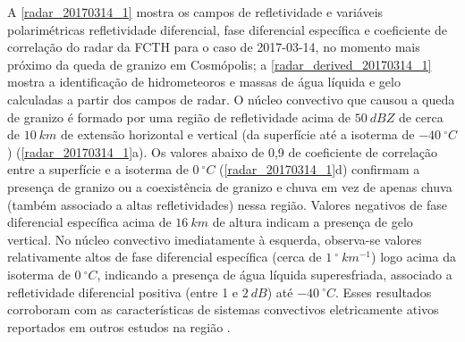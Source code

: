 A \autoref{radar_20170314_1} mostra os campos de refletividade e variáveis polarimétricas refletividade diferencial, fase diferencial específica e coeficiente de correlação do radar da FCTH para o caso de 2017-03-14, no momento mais próximo da queda de granizo em Cosmópolis; a \autoref{radar_derived_20170314_1} mostra a identificação de hidrometeoros e massas de água líquida e gelo calculadas a partir dos campos de radar. O núcleo convectivo que causou a queda de granizo é formado por uma região de refletividade acima de $50\:dBZ$ de cerca de $10\:km$ de extensão horizontal e vertical (da superfície até a isoterma de $-40\:^{\circ}C$) (\autoref{radar_20170314_1}a). Os valores abaixo de 0,9 de coeficiente de correlação entre a superfície e a isoterma de $0\:^{\circ}C$ (\autoref{radar_20170314_1}d) confirmam a presença de granizo ou a coexistência de granizo e chuva em vez de apenas chuva (também associado a altas refletividades) nessa região. Valores negativos de fase diferencial específica acima de $16\:km$ de altura indicam a presença de gelo vertical. No núcleo convectivo imediatamente à esquerda, observa-se valores relativamente altos de fase diferencial específica (cerca de $1\:^\circ\:km^{-1}$) logo acima da isoterma de $0\:^{\circ}C$, indicando a presença de água líquida superesfriada, associado a refletividade diferencial positiva (entre 1 e $2\:dB$) até $-40\:^{\circ}C$. Esses resultados corroboram com as características de sistemas convectivos eletricamente ativos reportados em outros estudos na região \cite{Mattos2015, Mattos2016a, Mattos2017}.


